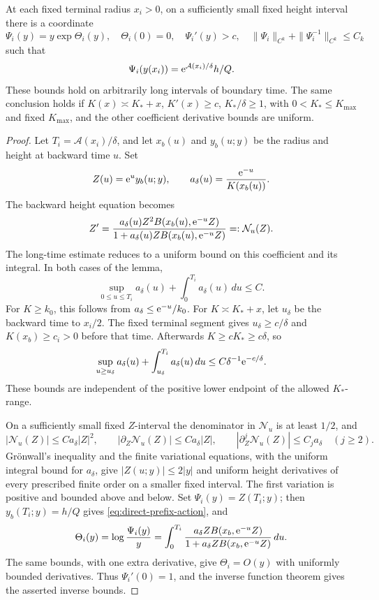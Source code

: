 \begin{lemma}
\label{lem:direct-source-height}
At each fixed terminal radius \(x_i>0\), on a sufficiently
small fixed height interval there is a coordinate
\[
 \Psi_i(y)=y\exp \Theta_i(y),\quad \Theta_i(0)=0,\quad
 \Psi_i'(y)>c,\quad
 \|\Psi_i\|_{C^k}+\|\Psi_i^{-1}\|_{C^k}\le C_k
\]
such that
\begin{equation}
\label{eq:direct-prefix-action}
 \Psi_i(y(x_i))=\mathrm e^{\mathcal A(x_i)/\delta}h/Q .
\end{equation}
These bounds hold on arbitrarily long intervals of boundary time.
The same conclusion holds if
\(K(x)\asymp K_*+x\), \(K'(x)\ge c\), \(K_*/\delta\ge1\),
with \(0<K_*\le K_{\max}\) and fixed \(K_{\max}\),
and the other coefficient derivative bounds are uniform.
\end{lemma}

\begin{proof}
Let \(T_i=\mathcal A(x_i)/\delta\), and let \(x_b(u)\) and \(y_b(u;y)\)
be the radius and height at backward time \(u\).
Set
\[
 Z(u)=\mathrm e^uy_b(u;y),\qquad
 a_\delta(u)=\frac{\mathrm e^{-u}}{K(x_b(u))}.
\]
The backward height equation becomes
\[
 Z'=\frac{a_\delta(u)Z^2B(x_b(u),\mathrm e^{-u}Z)}
           {1+a_\delta(u)ZB(x_b(u),\mathrm e^{-u}Z)}
       =:\mathcal N_u(Z).
\]
The long-time estimate reduces to a uniform bound on this coefficient
and its integral. In both cases of the lemma,
\[
 \sup_{0\le u\le T_i}a_\delta(u)
       +\int_0^{T_i}a_\delta(u)\,du\le C.
\]
For \(K\ge k_0\), this follows from \(a_\delta\le \mathrm e^{-u}/k_0\).
For \(K\asymp K_*+x\), let \(u_\delta\) be the backward
time to \(x_i/2\). The fixed terminal segment gives
\(u_\delta\ge c/\delta\) and \(K(x_b)\ge c_i>0\) before
that time. Afterwards \(K\ge cK_*\ge c\delta\), so
\[
 \sup_{u\ge u_\delta}a_\delta(u)
       +\int_{u_\delta}^{T_i}a_\delta(u)\,du
       \le C\delta^{-1}\mathrm e^{-c/\delta}.
\]
These bounds are independent of the positive lower endpoint
of the allowed \(K_*\)-range.

On a sufficiently small fixed \(Z\)-interval the denominator
in \(\mathcal N_u\) is at least \(1/2\), and
\[
 |\mathcal N_u(Z)|\le Ca_\delta|Z|^2,\qquad
 |\partial_Z\mathcal N_u(Z)|\le Ca_\delta|Z|,\qquad
 |\partial_Z^j\mathcal N_u(Z)|\le C_ja_\delta\quad(j\ge2).
\]
Gr\"onwall's inequality and the finite variational equations, with
the uniform integral bound for \(a_\delta\), give \(|Z(u;y)|\le2|y|\)
and uniform height derivatives of every prescribed finite order on a
smaller fixed interval. The first variation is positive and bounded
above and below. Set \(\Psi_i(y)=Z(T_i;y)\); then
\(y_b(T_i;y)=h/Q\) gives \eqref{eq:direct-prefix-action}, and
\[
 \Theta_i(y)=\log\frac{\Psi_i(y)}y
 =\int_0^{T_i}
   \frac{a_\delta ZB(x_b,\mathrm e^{-u}Z)}
        {1+a_\delta ZB(x_b,\mathrm e^{-u}Z)}\,du .
\]
The same bounds, with one extra derivative, give \(\Theta_i=O(y)\)
with uniformly bounded derivatives. Thus \(\Psi_i'(0)=1\), and the
inverse function theorem gives the asserted inverse bounds.
\end{proof}


